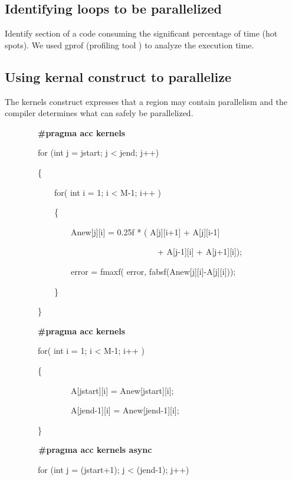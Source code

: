 \documentclass[a4paper]{article}
\begin{document}
\bigskip

\subsection[Identifying loops to be parallelized]{\rmfamily Identifying loops to be parallelized}
Identify section of a code consuming the significant percentage of time (hot spots). We used gprof (profiling tool ) to
analyze the execution time.

\subsection[Using kernal construct to parallelize ]{\rmfamily Using kernal construct to parallelize }
The kernels construct expresses that a region may contain parallelism and the compiler determines what can safely be
parallelized.

\ \ \ \ \ \ \ \ \textbf{\#pragma acc kernels}

\ \ \ \ \ \ \ \ for (int j = jstart; j {\textless} jend; j++)

\ \ \ \ \ \ \ \ \{

\ \ \ \ \ \ \ \ \ \ \ \ for( int i = 1; i {\textless} M-1; i++ )

\ \ \ \ \ \ \ \ \ \ \ \ \{

\ \ \ \ \ \ \ \ \ \ \ \ \ \ \ \ Anew[j][i] = 0.25f * ( A[j][i+1] + A[j][i-1]

\ \ \ \ \ \ \ \ \ \ \ \ \ \ \ \ \ \ \ \ \ \ \ \ \ \ \ \ \ \ \ \ \ \ \ \ \ + A[j-1][i] + A[j+1][i]);

\ \ \ \ \ \ \ \ \ \ \ \ \ \ \ \ error = fmaxf( error, fabsf(Anew[j][i]-A[j][i]));

\ \ \ \ \ \ \ \ \ \ \ \ \}

\ \ \ \ \ \ \ \ \}

\ \ \ \ \ \ \ \ \textbf{\#pragma acc kernels}

\ \ \ \ \ \ \ \ for( int i = 1; i {\textless} M-1; i++ )

\ \ \ \ \ \ \ \ \{

\ \ \ \ \ \ \ \ \ \ \ \ \ \ \ \ A[jstart][i] = Anew[jstart][i];

\ \ \ \ \ \ \ \ \ \ \ \ \ \ \ \ A[jend-1][i] = Anew[jend-1][i];

\ \ \ \ \ \ \ \ \}


\bigskip

\ \ \ \ \ \ \ \textbf{\ \#pragma acc kernels async}

\ \ \ \ \ \ \ \ for (int j = (jstart+1); j {\textless} (jend-1); j++)
\end{document}
